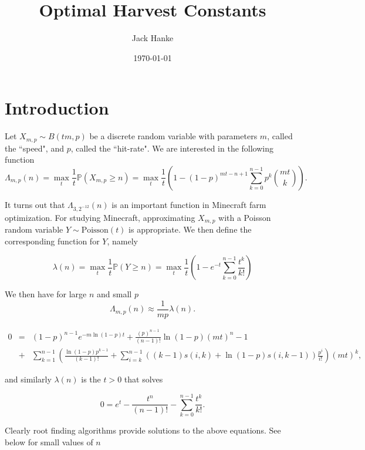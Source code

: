 \documentclass[12pt]{article}
\title{Optimal Harvest Constants}
\author{Jack Hanke}
\date{\today}
\theoremstyle{plain}
\theoremstyle{definition}
\theoremstyle{remark}
\theoremstyle{definition}
\begin{document}
\maketitle

\section{Introduction}
Let $X_{m,p} \sim B(tm,p)$ be a discrete random variable with parameters $m$, called the ``speed", and $p$, called the ``hit-rate". We are interested in the following function
\begin{equation}\label{eq: Lambda def}
    \Lambda_{m,p}(n) = \max_{t} \frac{1}{t}\mathbb{P}(X_{m,p} \geq n) = \max_{t} \frac{1}{t}\left(1-(1-p)^{mt-n+1}\sum_{k=0}^{n-1}p^k  \binom{mt}{k}\right).
\end{equation}

It turns out that $\Lambda_{3,2^{-12}}(n)$ is an important function in Minecraft farm optimization. For studying Minecraft, approximating $X_{m,p}$ with a Poisson random variable  $Y \sim \text{Poisson}(t)$ is appropriate. We then define the corresponding function for $Y$, namely 

\begin{equation}\label{eq: lambda def}
    \lambda(n) = \max_t \frac{1}{t}\mathbb{P}(Y \geq n) = \max_t \frac{1}{t}\left(1-e^{-t}\sum_{k=0}^{n-1}\frac{t^k}{k!}\right)
\end{equation}

We then have for large $n$ and small $p$
\begin{equation}
    \Lambda_{m,p}(n) \approx \frac{1}{mp}\lambda(n).
\end{equation}

\begin{eqnarray*}
    0 & = & (1-p)^{n-1}e^{-m\ln(1-p)t} + \frac{(p)^{n-1}}{(n-1)!}\ln(1-p)(mt)^n -1 \\
    & + & \sum_{k=1}^{n-1}\left(\frac{\ln(1-p)p^{k-1}}{(k-1)!} + \sum_{i=k}^{n-1}((k-1)s(i,k)+\ln(1-p)s(i,k-1))\frac{p^i}{i!}\right)(mt)^k,
\end{eqnarray*}

and similarly $\lambda(n)$ is the $t>0$ that solves

\begin{equation*}
    0 = e^t - \frac{t^n}{(n-1)!} - \sum_{k=0}^{n-1}\frac{t^k}{k!}.
\end{equation*}

Clearly root finding algorithms provide solutions to the above equations. See below for small values of $n$
\end{document}

